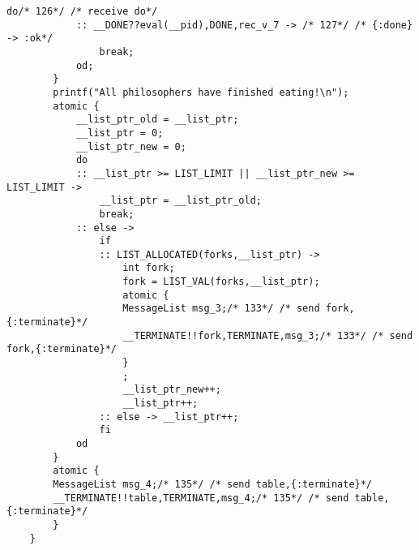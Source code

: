 \begin{lstlisting}[xleftmargin=.001\linewidth, xrightmargin=0.001\linewidth, caption={Dining Philosophers Promela translation.}, label={lst:promela_dp}]
            do/* 126*/ /* receive do*/ 
            :: __DONE??eval(__pid),DONE,rec_v_7 -> /* 127*/ /* {:done} -> :ok*/ 
                break;
            od;
        }
        printf("All philosophers have finished eating!\n");
        atomic {
            __list_ptr_old = __list_ptr;
            __list_ptr = 0;
            __list_ptr_new = 0;
            do
            :: __list_ptr >= LIST_LIMIT || __list_ptr_new >= LIST_LIMIT -> 
                __list_ptr = __list_ptr_old;
                break;
            :: else -> 
                if
                :: LIST_ALLOCATED(forks,__list_ptr) -> 
                    int fork;
                    fork = LIST_VAL(forks,__list_ptr);
                    atomic {
                    MessageList msg_3;/* 133*/ /* send fork,{:terminate}*/ 
                    __TERMINATE!!fork,TERMINATE,msg_3;/* 133*/ /* send fork,{:terminate}*/ 
                    }
                    ;
                    __list_ptr_new++;
                    __list_ptr++;
                :: else -> __list_ptr++;
                fi
            od
        }
        atomic {
        MessageList msg_4;/* 135*/ /* send table,{:terminate}*/ 
        __TERMINATE!!table,TERMINATE,msg_4;/* 135*/ /* send table,{:terminate}*/ 
        }
    }    
\end{lstlisting}